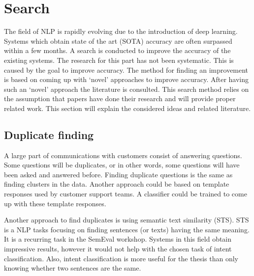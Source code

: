 \section{Search}
\label{sec:search}

The field of NLP is rapidly evolving due to the introduction of deep learning.
Systems which obtain state of the art (SOTA) accuracy are often surpassed within a few months.
A search is conducted to improve the accuracy of the existing systems.
The research for this part has not been systematic.
This is caused by the goal to improve accuracy.
The method for finding an improvement is based on coming up with `novel' approaches to improve accuracy.
After having such an `novel' approach the literature is consulted.
This search method relies on the assumption that papers have done their research and will provide proper related work.
This section will explain the considered ideas and related literature.

\subsection{Duplicate finding}
\label{subsec:duplicate_finding}
A large part of communications with customers consist of answering questions.
Some questions will be duplicates, or in other words, some questions will have been asked and answered before.
Finding duplicate questions is the same as finding clusters in the data.
Another approach could be based on template responses used by customer support teams.
A classifier could be trained to come up with these template responses.

Another approach to find duplicates is using semantic text similarity (STS).
STS is a NLP tasks focusing on finding sentences (or texts) having the same meaning.
It is a recurring task in the SemEval workshop.
Systems in this field obtain impressive results, however it would not help with the chosen task of intent classification.
Also, intent classification is more useful for the thesis than only knowing whether two sentences are the same.


